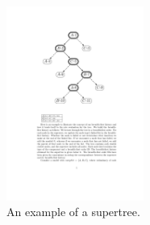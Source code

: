 \documentclass[12pt]{article}
\begin{document}
\begin{figure}
\begin{center}
\includegraphics[width=0.4\textwidth]{fig_tree}
\end{center}
\caption{An example of a supertree.}
\label{fig:tree}
\end{figure}
\end{document}
